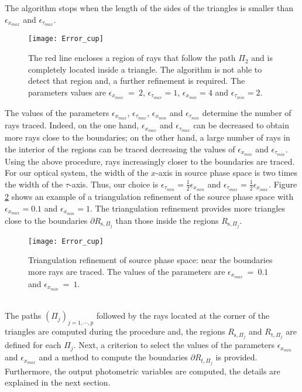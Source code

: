 The algorithm stops when the length of the sides of the triangles is smaller than $\epsilon_{x_{max}}$ and $\epsilon_{\tau_{max}}$.
\begin{figure}[t]
  \begin{center}
  \texttt{[image: Error\_cup]}
  \end{center}
  \caption{\footnotesize{The red line encloses a region of rays that follow the path $\Pi_2$ and is completely located inside a triangle.
  The algorithm is not able to detect that region and, a further refinement is required.
    The parameters values are $\epsilon_{x_{max}}~=~ 2$, $\epsilon_{\tau_{max}}= 1$, $\epsilon_{x_{min}}= 4$ and $\epsilon_{\tau_{min}}=2$. }}
   \label{fig:region inside}
  \end{figure}
The values of the parameters $\epsilon_{x_{max}}$, $\epsilon_{\tau_{max}}$, $\epsilon_{x_{min}}$ and $\epsilon_{\tau_{min}}$ determine the number of rays traced.
Indeed, on the one hand, $\epsilon_{x_{max}}$ and $\epsilon_{\tau_{max}}$ can be decreased to obtain more rays close to the boundaries;
on the other hand, a large number of rays in the interior of the regions can be traced decreasing the values of $\epsilon_{x_{min}}$ and $\epsilon_{\tau_{min}}$. %
\newline
\indent Using the above procedure, rays increasingly closer to the boundaries are traced.
For our optical system, the width of the $x$-axis in source phase space is two times the width of the $\tau$-axis.
Thus, our choice is $\epsilon_{\tau_{min}}=\frac{1}{2}\epsilon_{x_{min}}$ and $\epsilon_{\tau_{max}} = \frac{1}{2}\epsilon_{x_{max}}$.
Figure \ref{fig:triangulation_refinement} shows an example of a triangulation refinement of the source phase space with $\epsilon_{x_{max}}=0.1$ and $\epsilon_{x_{min}}=1$.
The triangulation refinement provides more triangles close to the boundaries $\partial R_{\textrm{s}, \Pi_j}$ than those inside the regions $R_{\textrm{s}, \Pi_j}$.
\begin{figure}[h]
  \begin{center}
  \texttt{[image: Error\_cup]}
  \end{center}
  \caption{\footnotesize{Triangulation refinement of source phase space:
  near the boundaries more rays are traced.
    The values of the parameters are $\epsilon_{x_{max}}~=~ 0.1$ and $\epsilon_{x_{min}}~=~1$.}}
   \label{fig:triangulation_refinement}
  \end{figure}
 \\ \indent The paths $(\Pi_j)_{j = 1, \cdots, p}$ followed by the rays located at the corner of the triangles are computed during the procedure and, the regions
 $R_{\textrm{s}, \Pi_j}$ and $R_{\textrm{t}, \Pi_j}$ are defined for each $\Pi_j$.
Next, a criterion to select the values of the parameters $\epsilon_{x_{min}}$ and $\epsilon_{x_{max}}$ and a method to compute the boundaries $\partial{R_{t, \Pi_j}}$ is provided.
Furthermore, the output photometric variables are computed, the details are explained in the next section.

